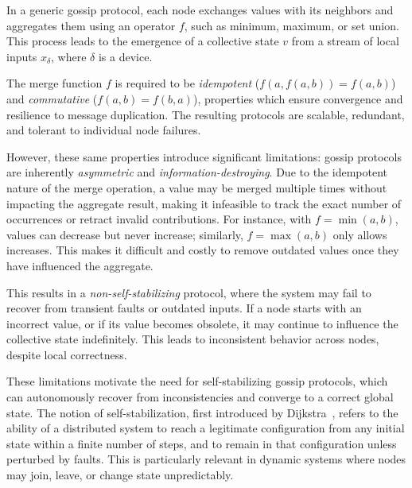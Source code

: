 \documentclass[runningheads]{llncs}
\begin{document}
In a generic gossip protocol,
each node exchanges values with its neighbors and aggregates them using an operator $f$,
such as minimum, maximum, or set union.
%
This process leads to the emergence of a collective state $v$ from a stream of local inputs $x_{\delta}$,
where $\delta$ is a device.

The merge function $f$ is required to be \textit{idempotent} ($f(a, f(a,b)) = f(a,b)$) and \textit{commutative} ($f(a,b) = f(b,a)$),
properties which ensure convergence and resilience to message duplication.
%
The resulting protocols are scalable, redundant, and tolerant to individual node failures.

However,
these same properties introduce significant limitations:
gossip protocols are inherently \emph{asymmetric} and \emph{information-destroying}.
%
Due to the idempotent nature of the merge operation,
a value may be merged multiple times without impacting the aggregate result,
making it infeasible to track the exact number of occurrences or retract invalid contributions.
%
For instance, with $f = \min(a,b)$,
values can decrease but never increase;
similarly,
$f = \max(a,b)$ only allows increases.
%
This makes it difficult and costly to remove outdated values once they have influenced the aggregate.

This results in a \emph{non-self-stabilizing} protocol,
where the system may fail to recover from transient faults or outdated inputs.
%
If a node starts with an incorrect value,
or if its value becomes obsolete,
it may continue to influence the collective state indefinitely.
%
This leads to inconsistent behavior across nodes, despite local correctness.

These limitations motivate the need for self-stabilizing gossip protocols,
which can autonomously recover from inconsistencies and converge to a correct global state.
%
The notion of self-stabilization,
first introduced by Dijkstra~\cite{DBLP:journals/cacm/Dijkstra74},
refers to the ability of a distributed system to reach a legitimate configuration from any initial state within a finite number of steps,
and to remain in that configuration unless perturbed by faults.
%
This is particularly relevant in dynamic systems where nodes may join, leave, or change state unpredictably.
\end{document}
